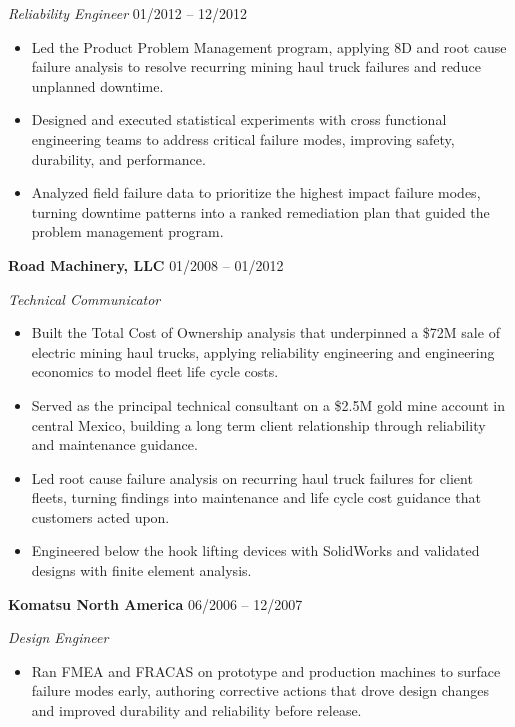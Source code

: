 \documentclass[10pt]{article}
\newcommand{\companyentry}[3]{%
  \smallskip\textbf{#1}\hspace{0.4em}{\color{slate}\small #2}\hfill{\color{slate}\small #3}\par}
\newcommand{\roledated}[2]{%
  \textit{#1}\hfill{\color{slate}\small #2}\par\vspace{1pt}}
\newcommand{\role}[1]{\textit{#1}\par\vspace{1pt}}
\begin{document}
\roledated{Reliability Engineer }{01/2012 -- 12/2012}
\begin{itemize}
    \item Led the Product Problem Management program, applying 8D and root cause failure analysis to resolve recurring mining haul truck failures and reduce unplanned downtime.
    \item Designed and executed statistical experiments with cross functional engineering teams to address critical failure modes, improving safety, durability, and performance.
    \item Analyzed field failure data to prioritize the highest impact failure modes, turning downtime patterns into a ranked remediation plan that guided the problem management program.
\end{itemize}

\companyentry{Road Machinery, LLC }{Phoenix, AZ}{01/2008 -- 01/2012}
\role{Technical Communicator}
\begin{itemize}
    \item Built the Total Cost of Ownership analysis that underpinned a \$72M sale of electric mining haul trucks, applying reliability engineering and engineering economics to model fleet life cycle costs.
    \item Served as the principal technical consultant on a \$2.5M gold mine account in central Mexico, building a long term client relationship through reliability and maintenance guidance.
    \item Led root cause failure analysis on recurring haul truck failures for client fleets, turning findings into maintenance and life cycle cost guidance that customers acted upon.
    \item Engineered below the hook lifting devices with SolidWorks and validated designs with finite element analysis.
\end{itemize}

\companyentry{Komatsu North America }{Chattanooga, TN}{06/2006 -- 12/2007}
\role{Design Engineer}
\begin{itemize}
    \item Ran FMEA and FRACAS on prototype and production machines to surface failure modes early, authoring corrective actions that drove design changes and improved durability and reliability before release.
\end{itemize}
\end{document}
